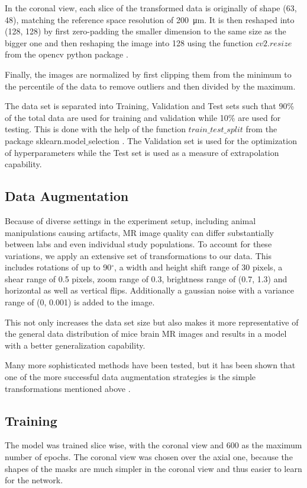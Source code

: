 In the coronal view, each slice of the transformed data is originally of shape (63, 48), matching the reference space resolution of \SI{200}{\micro\metre}.
It is then reshaped into (128, 128) by first zero-padding the smaller dimension to the same size as the bigger one and then reshaping the image into 128 using the function \textcolor{mg}{\texttt{$cv2.resize$}} from the opencv python package \cite{noauthor_opencv-python_nodate}.

Finally, the images are normalized by first clipping them from the minimum to the  percentile of the data to remove outliers and then divided by the maximum.

The data set is separated into Training, Validation and Test sets such that 90\% of the total data are used for training and validation while 10\% are used for testing.
This is done with the help of the function \textcolor{mg}{\texttt{$train\_test\_split$}} from the package sklearn.model$\_$selection \cite{scikit-learn}.
The Validation set is used for the optimization of hyperparameters while the Test set is used as a measure of extrapolation capability.

\subsection{Data Augmentation} \label{Data Augmentation}

Because of diverse settings in the experiment setup, including animal manipulations causing artifacts, MR image quality can differ substantially between labs and even individual study populations.
To account for these variations, we apply an extensive set of transformations to our data.
This includes rotations of up to 90$^{\circ}$, a width and height shift range of 30 pixels, a shear range of 0.5 pixels, zoom range of 0.3, brightness range of (0.7, 1.3) and horizontal as well as vertical flips.
Additionally a gaussian noise with a variance range of (0, 0.001) is added to the image.

This not only increases the data set size but also makes it more representative of the general data distribution of mice brain MR images and results in a model with a better generalization capability.

Many more sophisticated methods have been tested, but it has been shown that one of the more successful data augmentation strategies is the simple transformations mentioned above \cite{perez_effectiveness_2017}.


\subsection{Training}
The model was trained slice wise, with the coronal view and 600 as the maximum number of epochs.
The coronal view was chosen over the axial one, because the shapes of the masks are much simpler in the coronal view and thus easier to learn for the network.

